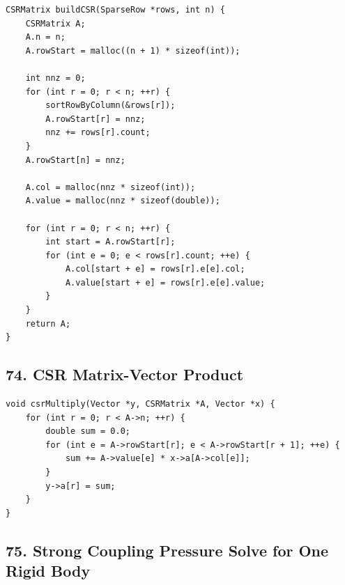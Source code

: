 \documentclass[10pt,letterpaper]{article}
\begin{document}
\begin{verbatim}
CSRMatrix buildCSR(SparseRow *rows, int n) {
    CSRMatrix A;
    A.n = n;
    A.rowStart = malloc((n + 1) * sizeof(int));

    int nnz = 0;
    for (int r = 0; r < n; ++r) {
        sortRowByColumn(&rows[r]);
        A.rowStart[r] = nnz;
        nnz += rows[r].count;
    }
    A.rowStart[n] = nnz;

    A.col = malloc(nnz * sizeof(int));
    A.value = malloc(nnz * sizeof(double));

    for (int r = 0; r < n; ++r) {
        int start = A.rowStart[r];
        for (int e = 0; e < rows[r].count; ++e) {
            A.col[start + e] = rows[r].e[e].col;
            A.value[start + e] = rows[r].e[e].value;
        }
    }
    return A;
}
\end{verbatim}

\subsection*{74. CSR Matrix-Vector Product}

\begin{verbatim}
void csrMultiply(Vector *y, CSRMatrix *A, Vector *x) {
    for (int r = 0; r < A->n; ++r) {
        double sum = 0.0;
        for (int e = A->rowStart[r]; e < A->rowStart[r + 1]; ++e) {
            sum += A->value[e] * x->a[A->col[e]];
        }
        y->a[r] = sum;
    }
}
\end{verbatim}

\subsection*{75. Strong Coupling Pressure Solve for One Rigid Body}
\end{document}
